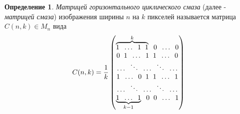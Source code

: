 \documentclass[a4paper]{article}
\theoremstyle{definition}
\newtheorem{definition}{Определение}[section]
\begin{document}
\newpage
    \begin{definition}
    \label{blur matrix}
	\emph{Матрицей горизонтального циклического смаза} (далее - \emph{матрицей смаза}) изображения ширины $n$ на $k$ пикселей называется матрица $C(n, k) \in M_n$ вида
    $$
    C(n, k) = \frac{1}{k}\begin{pmatrix}
          \overbrace{1 \hspace*{2mm} \ldots \hspace*{2mm} 1 \hspace*{2mm} 1}^{k} \hspace*{2mm} 0 \hspace*{2mm} \ldots \hspace*{2mm} 0 \\
          0 \hspace*{2mm} 1 \hspace*{2mm} \ldots \hspace*{2mm} 1 \hspace*{2mm} 1 \hspace*{2mm} \ldots \hspace*{2mm} 0 \\
          \ldots \hspace*{2mm} \ddots \hspace*{2mm} \ldots \hspace*{2mm} \ddots \hspace*{2mm} \ldots \\
          1 \hspace*{2mm} \ldots \hspace*{2mm} 0 \hspace*{2mm} 1 \hspace*{2mm} 1 \hspace*{2mm} \ldots \hspace*{2mm} 1 \\
          \ldots \hspace*{2mm} \ddots \hspace*{2mm} \ldots \hspace*{2mm} \ddots \hspace*{2mm} \ldots\\
          \underbrace{1 \hspace*{2mm} \ldots \hspace*{2mm} 1}_{k-1} \hspace*{2mm} 0 \hspace*{2mm} 0 \hspace*{2mm} \ldots \hspace*{2mm} 1
        \end{pmatrix}
    $$
    \end{definition}
\end{document}
